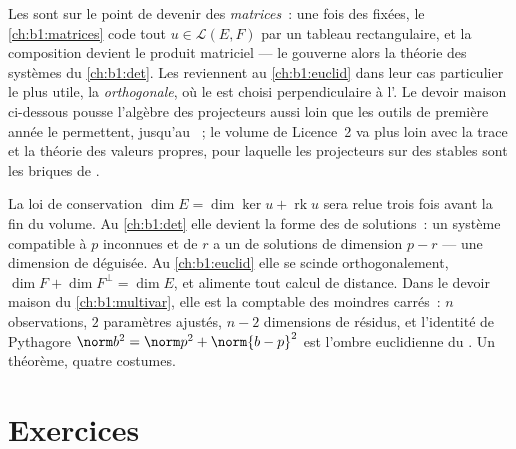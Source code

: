 \begin{remark}
\label{rem:b1:linmaps:whereused}
Les  sont sur le point de devenir des \emph{matrices}~: une fois
des  fixées, le \cref{ch:b1:matrices} code tout $u \in \mathcal{L}(E,
F)$ par un tableau rectangulaire, et la composition devient le produit
matriciel --- le  gouverne alors la théorie des systèmes
 du \cref{ch:b1:det}. Les  reviennent au
\cref{ch:b1:euclid} dans leur cas particulier le plus utile, la 
\emph{orthogonale}, où le  est choisi perpendiculaire à l'.
Le devoir maison ci-dessous pousse l'algèbre des projecteurs aussi loin que
les outils de première année le permettent, jusqu'au ~; le
volume de Licence~2 va plus loin avec la trace et la théorie des valeurs
propres, pour laquelle les projecteurs sur des  stables sont les
briques de .
\end{remark}

\begin{remark}
\label{rem:b1:linmaps:perspectives}
La loi de conservation $\dim E = \dim\ker u + \operatorname{rk} u$
sera relue trois fois avant la fin du volume. Au
\cref{ch:b1:det} elle devient la forme des  de solutions~: un
système compatible à $p$ inconnues et de  $r$ a un  de
solutions de dimension $p - r$ --- une dimension de  déguisée. Au
\cref{ch:b1:euclid} elle se scinde orthogonalement, $\dim F + \dim
F^\perp = \dim E$, et alimente tout calcul de distance. Dans
le devoir maison du \cref{ch:b1:multivar}, elle est la
comptable des moindres carrés~: $n$ observations, $2$ paramètres ajustés,
$n - 2$ dimensions de résidus, et l'identité de Pythagore
$\norm b^2 = \norm p^2 + \norm{b - p}^2$ est l'ombre euclidienne du
. Un théorème, quatre costumes.
\end{remark}

\section{Exercices}

